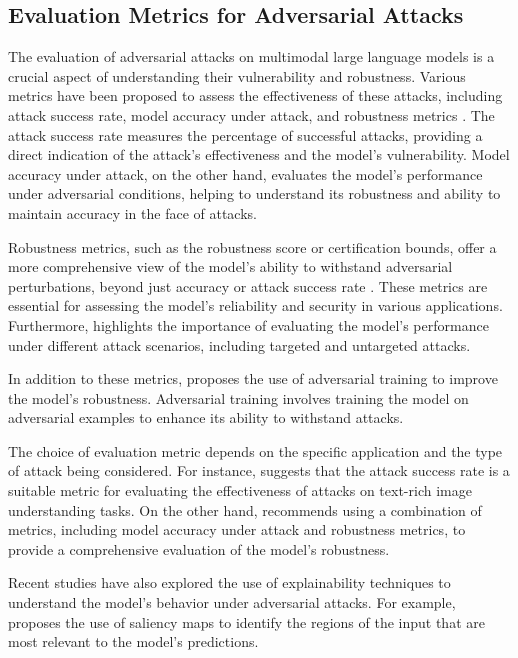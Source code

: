 \documentclass[11pt,a4paper]{article}
\begin{document}
\subsection{Evaluation Metrics for Adversarial Attacks}


The evaluation of adversarial attacks on multimodal large language models is a crucial aspect of understanding their vulnerability and robustness. Various metrics have been proposed to assess the effectiveness of these attacks, including attack success rate, model accuracy under attack, and robustness metrics \cite{arxiv:2401.13601}. The attack success rate measures the percentage of successful attacks, providing a direct indication of the attack's effectiveness and the model's vulnerability. Model accuracy under attack, on the other hand, evaluates the model's performance under adversarial conditions, helping to understand its robustness and ability to maintain accuracy in the face of attacks.

Robustness metrics, such as the robustness score or certification bounds, offer a more comprehensive view of the model's ability to withstand adversarial perturbations, beyond just accuracy or attack success rate \cite{arxiv:2408.08632}. These metrics are essential for assessing the model's reliability and security in various applications. Furthermore, \cite{arxiv:2409.15310} highlights the importance of evaluating the model's performance under different attack scenarios, including targeted and untargeted attacks.

In addition to these metrics, \cite{arxiv:2408.15769} proposes the use of adversarial training to improve the model's robustness. Adversarial training involves training the model on adversarial examples to enhance its ability to withstand attacks. 

The choice of evaluation metric depends on the specific application and the type of attack being considered. For instance, \cite{arxiv:2502.16586} suggests that the attack success rate is a suitable metric for evaluating the effectiveness of attacks on text-rich image understanding tasks. On the other hand, \cite{arxiv:2408.15769} recommends using a combination of metrics, including model accuracy under attack and robustness metrics, to provide a comprehensive evaluation of the model's robustness.

Recent studies have also explored the use of explainability techniques to understand the model's behavior under adversarial attacks. For example, \cite{arxiv:2405.14612} proposes the use of saliency maps to identify the regions of the input that are most relevant to the model's predictions. 
\end{document}
